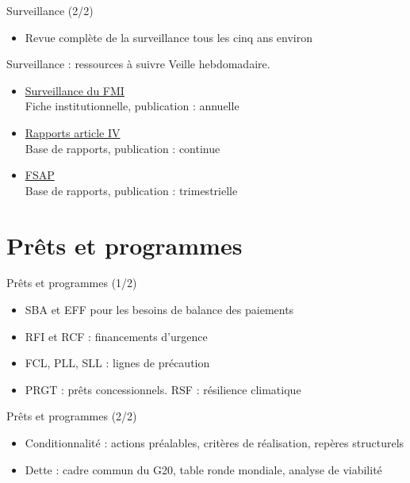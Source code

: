 \documentclass[aspectratio=169,11pt]{beamer}
\begin{document}
\begin{frame}{Surveillance (2/2)}
\begin{itemize}
\item Revue complète de la surveillance tous les cinq ans environ
\end{itemize}
\end{frame}

\begin{frame}{Surveillance : ressources à suivre}
\small
Veille hebdomadaire.
\begin{itemize}
\item \href{https://www.imf.org/en/About/Factsheets/Sheets/2023/IMF-Surveillance}{Surveillance du FMI}\\{\footnotesize Fiche institutionnelle, publication : annuelle}
\item \href{https://www.imf.org/en/Publications/CR}{Rapports article IV}\\{\footnotesize Base de rapports, publication : continue}
\item \href{https://www.imf.org/en/Publications/FSAP}{FSAP}\\{\footnotesize Base de rapports, publication : trimestrielle}
\end{itemize}
\end{frame}

\section{Prêts et programmes}
\begin{frame}{Prêts et programmes (1/2)}
\begin{itemize}
\item SBA et EFF pour les besoins de balance des paiements
\item RFI et RCF : financements d'urgence
\item FCL, PLL, SLL : lignes de précaution
\item PRGT : prêts concessionnels. RSF : résilience climatique
\end{itemize}
\end{frame}

\begin{frame}{Prêts et programmes (2/2)}
\begin{itemize}
\item Conditionnalité : actions préalables, critères de réalisation, repères structurels
\item Dette : cadre commun du G20, table ronde mondiale, analyse de viabilité
\end{itemize}
\end{frame}
\end{document}
